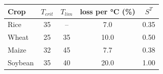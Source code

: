 \begin{tabular}{lcccc}
\toprule
Crop & $T_{crit}$ & $T_{lim}$ & loss per \si{\celsius} (\%) & $S^{T}$\\
\midrule
Rice & 35 & -- & 7.0 & 0.35 \\
Wheat & 25 & 35 & 10.0 & 0.50 \\
Maize & 32 & 45 & 7.7 & 0.38 \\
Soybean & 35 & 40 & 20.0 & 1.00 \\
\bottomrule
\end{tabular}
